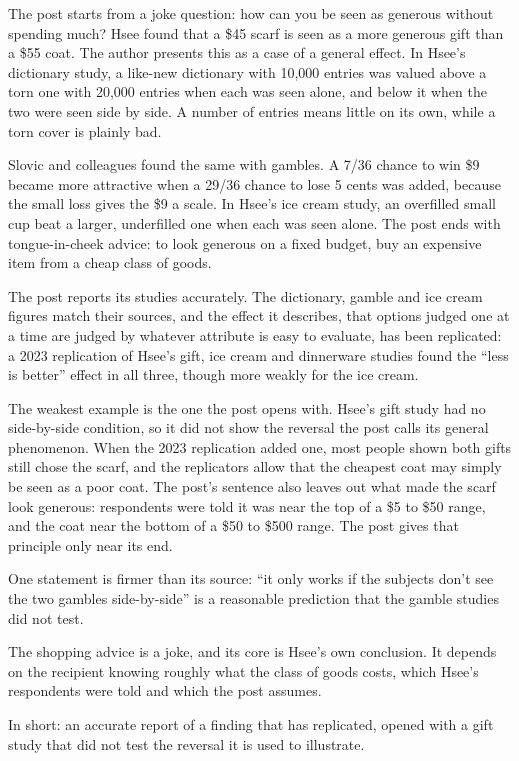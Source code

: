 \begin{afterword}
\summaryhead

The post starts from a joke question: how can you be seen as generous without spending much? Hsee found that a \$45 scarf is seen as a more generous gift than a \$55 coat. The author presents this as a case of a general effect. In Hsee's dictionary study, a like-new dictionary with 10,000 entries was valued above a torn one with 20,000 entries when each was seen alone, and below it when the two were seen side by side. A number of entries means little on its own, while a torn cover is plainly bad.

Slovic and colleagues found the same with gambles. A 7/36 chance to win \$9 became more attractive when a 29/36 chance to lose 5 cents was added, because the small loss gives the \$9 a scale. In Hsee's ice cream study, an overfilled small cup beat a larger, underfilled one when each was seen alone. The post ends with tongue-in-cheek advice: to look generous on a fixed budget, buy an expensive item from a cheap class of goods.

\responsehead

The post reports its studies accurately. The dictionary, gamble and ice cream figures match their sources, and the effect it describes, that options judged one at a time are judged by whatever attribute is easy to evaluate, has been replicated: a 2023 replication of Hsee's gift, ice cream and dinnerware studies found the ``less is better'' effect in all three, though more weakly for the ice cream.

The weakest example is the one the post opens with. Hsee's gift study had no side-by-side condition, so it did not show the reversal the post calls its general phenomenon. When the 2023 replication added one, most people shown both gifts still chose the scarf, and the replicators allow that the cheapest coat may simply be seen as a poor coat. The post's sentence also leaves out what made the scarf look generous: respondents were told it was near the top of a \$5 to \$50 range, and the coat near the bottom of a \$50 to \$500 range. The post gives that principle only near its end.

One statement is firmer than its source: ``it only works if the subjects don't see the two gambles side-by-side'' is a reasonable prediction that the gamble studies did not test.

The shopping advice is a joke, and its core is Hsee's own conclusion. It depends on the recipient knowing roughly what the class of goods costs, which Hsee's respondents were told and which the post assumes.

In short: an accurate report of a finding that has replicated, opened with a gift study that did not test the reversal it is used to illustrate.
\end{afterword}
